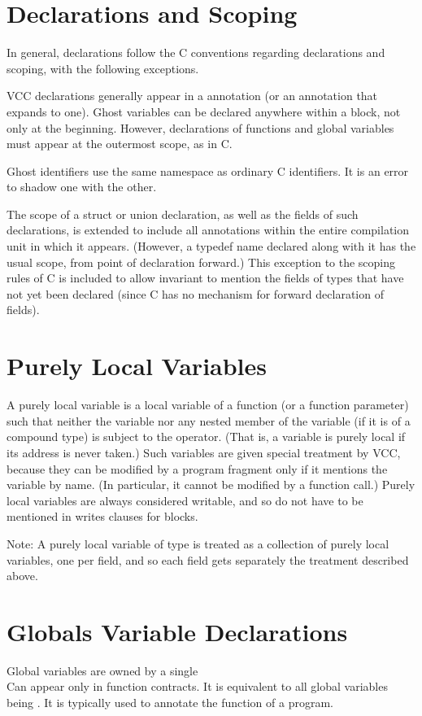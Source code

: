 \documentclass[preprint,nocopyrightspace]{sigplanconf}
\begin{document}
{{{\section{Declarations and Scoping}
In general, declarations follow the C conventions regarding
declarations and scoping, with the following exceptions. 

VCC declarations generally appear in a  annotation (or
an annotation that expands to one). Ghost variables can be declared
anywhere within a block, not only at the beginning. However, 
declarations of functions and global variables must appear at the
outermost scope, as in C. 

Ghost identifiers use the same namespace as ordinary C identifiers. It
is an error to shadow one with the other. 

The scope of a struct or union declaration, as well as the fields of
such declarations, is extended to include all annotations within the
entire compilation unit in which it appears. (However, a typedef name
declared along with it has the usual scope, from point of declaration
forward.) This exception to the scoping rules of C is included to
allow invariant to mention the fields of types that have not yet been
declared (since C has no mechanism for forward declaration of fields).

\section{Purely Local Variables}
A purely local variable is a local variable of a function (or a
function parameter) such that neither the variable nor any nested
member of the variable (if it is of a compound type) is subject to
the \vcc{&} operator. (That is, a variable is purely local if its
address is never taken.)  Such variables are given special treatment
by VCC, because they can be modified by a program fragment only if it
mentions the variable by name. (In particular, it cannot be modified
by a function call.) Purely local variables are always considered
writable, and so do not have to be mentioned in writes clauses for
blocks. 

Note: A purely local variable of  type is treated
as a collection of purely local variables, one per field, and so each
field gets separately the treatment described above.

\section{Globals Variable Declarations}
Global variables are owned by a single 
\\
Can appear only in function contracts. It is equivalent to all global
variables being \vcc{\mutable}. It is typically used to annotate
the  function of a program.

}}}
\end{document}
